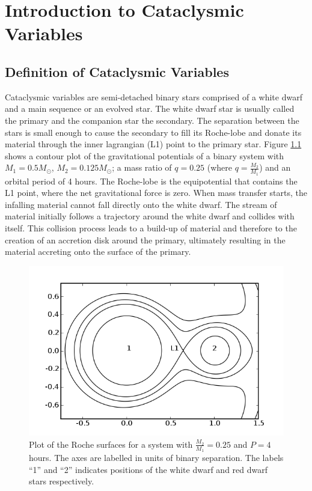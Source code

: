 \chapter{Introduction to Cataclysmic Variables}


\section{Definition of Cataclysmic Variables}

Cataclysmic variables are semi-detached binary stars comprised of a white dwarf and a main sequence or an evolved star. The white dwarf star is usually called the primary and the companion star the secondary. The separation between the stars is small enough to cause the secondary to fill its Roche-lobe and donate its material through the inner lagrangian (L1) point to the primary star. Figure \ref{roche} shows a contour plot of the gravitational potentials of a binary system with $M_{1}=0.5M_{\odot}$, $M_{2}=0.125M_{\odot}$;  a mass ratio of $q = 0.25$ (where $q = \frac{M_{2}}{M_{1}}$) and an orbital period of 4 hours. The Roche-lobe is the equipotential that contains the L1 point, where the net gravitational force is zero. When mass transfer starts, the infalling material cannot fall directly onto the white dwarf. The stream of material initially follows a trajectory around the white dwarf and collides with itself. This collision process leads to a build-up of material and therefore  to the creation of an accretion disk around the primary, ultimately resulting in the material accreting onto the surface of the primary.

\begin{figure}
 \centering
 \includegraphics[width=0.85\columnwidth,bb=0 0 600 400]{images/roche.png}
 \caption[Plot of Roche surface]{Plot of the Roche surfaces for a system with $\frac{M_{2}}{M_{1}}  = 0.25$ and $P = 4$ hours. The axes are labelled in units of binary separation. The labels ``1'' and ``2'' indicates positions of the white dwarf and red dwarf stars respectively.}
 \label{roche}
\end{figure}


